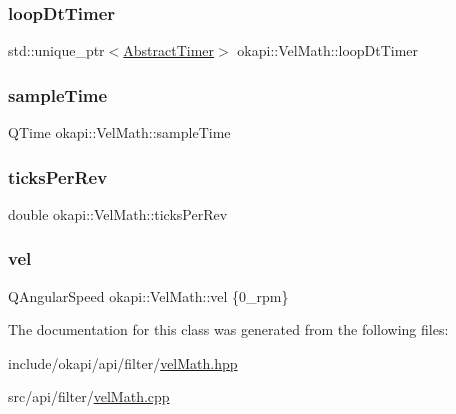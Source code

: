 \subsubsection{\texorpdfstring{loopDtTimer}{loopDtTimer}}
{\footnotesize\ttfamily std\+::unique\+\_\+ptr$<$\mbox{\hyperlink{classokapi_1_1AbstractTimer}{Abstract\+Timer}}$>$ okapi\+::\+Vel\+Math\+::loop\+Dt\+Timer\hspace{0.3cm}{\ttfamily [protected]}}

\mbox{\label{classokapi_1_1VelMath_a015a781b3f7f454f24b1a86a43a9a76d}} 
\subsubsection{\texorpdfstring{sampleTime}{sampleTime}}
{\footnotesize\ttfamily Q\+Time okapi\+::\+Vel\+Math\+::sample\+Time\hspace{0.3cm}{\ttfamily [protected]}}

\mbox{\label{classokapi_1_1VelMath_ad889516cc153d23febbbfd4c9c45e5ec}} 
\subsubsection{\texorpdfstring{ticksPerRev}{ticksPerRev}}
{\footnotesize\ttfamily double okapi\+::\+Vel\+Math\+::ticks\+Per\+Rev\hspace{0.3cm}{\ttfamily [protected]}}

\mbox{\label{classokapi_1_1VelMath_af8386892892d453a118581e46839a0c3}} 
\subsubsection{\texorpdfstring{vel}{vel}}
{\footnotesize\ttfamily Q\+Angular\+Speed okapi\+::\+Vel\+Math\+::vel \{0\+\_\+rpm\}\hspace{0.3cm}{\ttfamily [protected]}}



The documentation for this class was generated from the following files\+:\begin{DoxyCompactItemize}
\item 
include/okapi/api/filter/\mbox{\hyperlink{velMath_8hpp}{vel\+Math.\+hpp}}\item 
src/api/filter/\mbox{\hyperlink{velMath_8cpp}{vel\+Math.\+cpp}}\end{DoxyCompactItemize}
